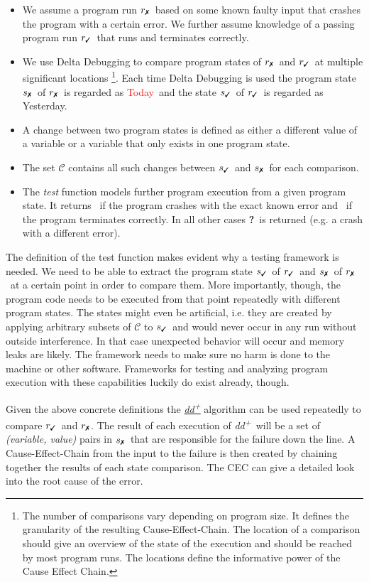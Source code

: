 \documentclass[a4paper,UKenglish]{lipics-v2018}
\newcommand{\ddp}{\textit{dd\textsuperscript{+}}}
\newcommand{\green}[1]{\textcolor{td-green}{#1}}
\newcommand{\red}[1]{\textcolor{red}{#1}}
\newcommand{\yd}[0]{\green{Yesterday}}
\newcommand{\td}[0]{\red{Today}}
\newcommand{\C}[0]{\ensuremath{\mathcal{C}}}
\newcommand{\cmark}{\text{\ding{51}}}
\newcommand{\xmark}{\text{\ding{55}}}
\newcommand{\qmark}{\textbf{?}}
\newcommand{\rpass}[0]{\ensuremath{r_{\cmark}}}
\newcommand{\rfail}[0]{\ensuremath{r_{\xmark}}}
\newcommand{\spass}[0]{\ensuremath{s_{\cmark}}}
\newcommand{\sfail}[0]{\ensuremath{s_{\xmark}}}
\begin{document}
\begin{itemize}
	\item We assume a program run \rfail\ based on some known faulty input that crashes the program with a certain error. We further assume knowledge of a passing program run \rpass\ that runs and terminates correctly.
	\item We use Delta Debugging to compare program states of \rfail\ and \rpass\ at multiple significant locations \footnote{The number of comparisons vary depending on program size. It defines the granularity of the resulting Cause-Effect-Chain. The location of a comparison should give an overview of the state of the execution and should be reached by most program runs. The locations define the informative power of the Cause Effect Chain.}. Each time Delta Debugging is used the program state \sfail\ of \rfail\ is regarded as \td\ and the state \spass\ of \rpass\ is regarded as \yd.
	\item A change between two program states is defined as either a different value of a variable or a variable that only exists in one program state.
	\item The set $\C$ contains all such changes between \spass\ and \sfail\ for each comparison.
	\item The \textit{test} function models further program execution from a given program state. It returns \xmark\ if the program crashes with the exact known error and \cmark\ if the program terminates correctly. In all other cases \qmark\ is returned (e.g. a crash with a different error). 
\end{itemize}

The definition of the test function makes evident why a testing framework is needed. We need to be able to extract the program state \spass\ of \rpass\ and \sfail\ of \rfail\ at a certain point in order to compare them. More importantly, though, the program code needs to be executed from that point repeatedly with different program states. The states might even be artificial, i.e. they are created by applying arbitrary subsets of $\C$ to \spass\ and would never occur in any run without outside interference. In that case unexpected behavior will occur and memory leaks are likely. The framework needs to make sure no harm is done to the machine or other software. Frameworks for testing and analyzing program execution with these capabilities luckily do exist already, though.

Given the above concrete definitions the \hyperref[fig:ddp]{\ddp} algorithm can be used repeatedly to compare \rpass\ and \rfail. The result of each execution of \ddp\ will be a set of \textit{(variable, value)} pairs in \sfail\ that are responsible for the failure down the line. A Cause-Effect-Chain from the input to the failure is then created by chaining together the results of each state comparison. The CEC can give a detailed look into the root cause of the error.\\
\end{document}

